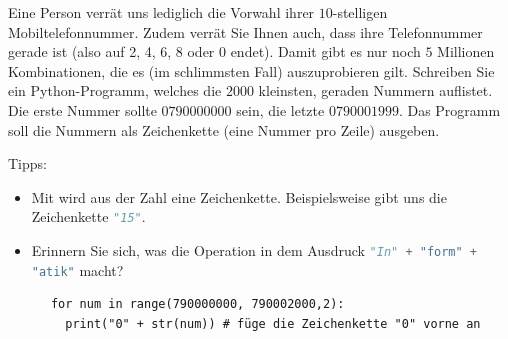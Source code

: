 \begin{mychallenge}
  Eine Person verrät uns lediglich die Vorwahl ihrer $10$-stelligen Mobiltelefonnummer. Zudem verrät Sie Ihnen auch, dass ihre Telefonnummer gerade ist (also auf 2, 4, 6, 8 oder 0 endet).
  Damit gibt es nur noch $5$ Millionen Kombinationen, die es (im schlimmsten Fall) auszuprobieren gilt. 
  Schreiben Sie ein Python-Programm, welches die $2000$ kleinsten, geraden Nummern auflistet. 
  Die erste Nummer sollte $0790000000$ sein, die letzte $0790001999$. 
  Das Programm soll die Nummern als Zeichenkette (eine Nummer pro Zeile) ausgeben.
  
  Tipps:
  \begin{itemize}
    \item Mit  
      wird aus der Zahl  eine Zeichenkette.
      Beispielsweise gibt uns 
      die Zeichenkette \lstinline[language=Python,basicstyle=\ttfamily\normalsize]!"15"!.
    \item Erinnern Sie sich, was die Operation \pythoninline{+} in dem Ausdruck \lstinline[language=Python,basicstyle=\ttfamily\normalsize]!"In" + "form" + "atik"! macht?
  \end{itemize}
  \begin{myanswer}
    \begin{lstlisting}
      for num in range(790000000, 790002000,2):
        print("0" + str(num)) # füge die Zeichenkette "0" vorne an
    \end{lstlisting}
  \end{myanswer}
\end{mychallenge}